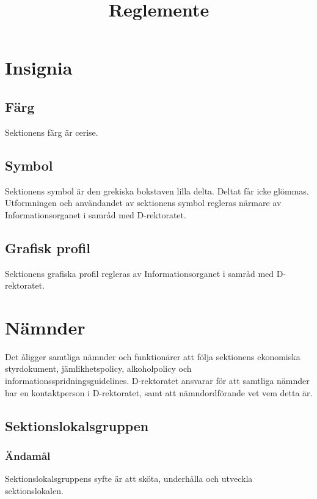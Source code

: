 \documentclass{dgovdoc}
\title{Reglemente}
\begin{document}
\maketitle

\section{Insignia}

\subsection{Färg}

Sektionens färg är cerise.

\subsection{Symbol}

Sektionens symbol är den grekiska bokstaven lilla delta. Deltat får icke
glömmas. Utformningen och användandet av sektionens symbol regleras närmare av
Informationsorganet i samråd med D-rektoratet.

\subsection{Grafisk profil}

Sektionens grafiska profil regleras av Informationsorganet i samråd med
D-rektoratet.

\section{Nämnder}

Det åligger samtliga nämnder och funktionärer att följa sektionens ekonomiska
styrdokument, jämlikhetspolicy, alkoholpolicy och
informationsspridningsguidelines. D-rektoratet ansvarar för att samtliga
nämnder har en kontaktperson i D-rektoratet, samt att nämndordförande vet vem
detta är.

\subsection{Sektionslokalsgruppen}

\subsubsection{Ändamål}

Sektionslokalsgruppens syfte är att sköta, underhålla och utveckla
sektionslokalen.
\end{document}
